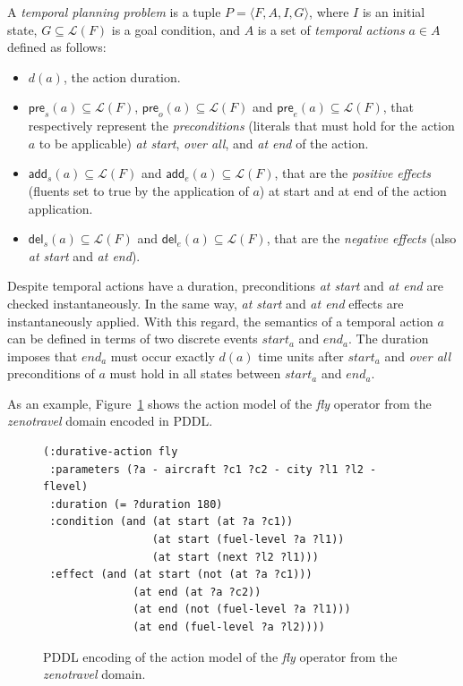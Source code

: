 \documentclass[letterpaper]{article} %
\newcommand{\tup}[1]{{\langle #1 \rangle}}
\newcommand{\pre}{\mathsf{pre}}     %
\newcommand{\del}{\mathsf{del}}     %
\newcommand{\add}{\mathsf{add}}     %
\begin{document}
A {\em temporal planning problem} is a tuple $P=\tup{F,A,I,G}$, where $I$ is an initial state, $G\subseteq\mathcal{L}(F)$ is a goal condition, and $A$ is a set of {\em temporal actions} $a\in A$ defined as follows:
\begin{itemize}
\item $d(a)$, the action duration.
\item $\pre_s(a)\subseteq\mathcal{L}(F)$, $\pre_o(a)\subseteq\mathcal{L}(F)$ and $\pre_e(a)\subseteq\mathcal{L}(F)$, that respectively represent the {\em preconditions} (literals that must hold for the action $a$ to be applicable) {\em at start}, {\em over all}, and {\em at end} of the action.

\item $\add_s(a)\subseteq\mathcal{L}(F)$ and $\add_e(a)\subseteq\mathcal{L}(F)$, that are the {\em positive effects} (fluents set to true by the application of $a$) at start and at end of the action application.
\item  $\del_s(a)\subseteq\mathcal{L}(F)$ and $\del_e(a)\subseteq\mathcal{L}(F)$, that are the {\em negative effects} (also {\em at start} and {\em at end}).
\end{itemize}
Despite temporal actions have a duration, preconditions {\em at start} and {\em at end} are checked instantaneously. In the same way, {\em at start} and {\em at end} effects are instantaneously applied. With this regard, the semantics of a temporal action $a$ can be defined in terms of two discrete events $start_a$ and $end_a$. The duration imposes that $end_a$ must occur exactly $d(a)$ time units after $start_a$ and {\em over all} preconditions of $a$ must hold in all states between $start_a$ and $end_a$.

As an example, Figure~\ref{fig:fly} shows the action model of the {\em fly} operator from the {\em zenotravel} domain encoded in PDDL.

\begin{figure}[hbt!]
	\begin{scriptsize}
		\begin{verbatim}
(:durative-action fly 
 :parameters (?a - aircraft ?c1 ?c2 - city ?l1 ?l2 - flevel)
 :duration (= ?duration 180)
 :condition (and (at start (at ?a ?c1))
                 (at start (fuel-level ?a ?l1))
                 (at start (next ?l2 ?l1)))
 :effect (and (at start (not (at ?a ?c1)))
              (at end (at ?a ?c2))
              (at end (not (fuel-level ?a ?l1)))
              (at end (fuel-level ?a ?l2)))) 
		\end{verbatim}
	\end{scriptsize}
	\caption{PDDL encoding of the action model of the {\em fly} operator from the {\em zenotravel} domain.}
	\label{fig:fly}
\end{figure}
\end{document}

